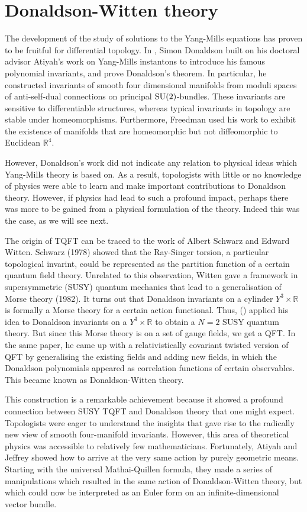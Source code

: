 \section*{Donaldson-Witten theory}
The development of the study of solutions to the Yang-Mills equations 
has proven to be fruitful for differential topology.
In \citeyear{don83}, Simon Donaldson built on his doctoral advisor Atiyah's work on 
Yang-Mills instantons to introduce his famous polynomial invariants, and prove 
Donaldson's theorem.\cite{don83}
In particular, he constructed invariants of
smooth four dimensional manifolds from moduli spaces of anti-self-dual
connections on principal $\operatorname{SU}(2)$-bundles.
These invariants are sensitive to differentiable structures, whereas typical
invariants in topology are stable under homeomorphisms.
Furthermore, Freedman used his work to exhibit the existence of manifolds that
are homeomorphic but not diffeomorphic to Euclidean $\mathbb{R}^{4}$. 

However, Donaldson's work did not
indicate any relation to physical ideas which Yang-Mills theory is based
on. As a result, topologists with little or no knowledge of physics were able to 
learn and make important contributions to Donaldson theory. However, if physics
had lead to such a profound impact, perhaps there was more to be gained from a
physical formulation of the theory. Indeed this was the case, as we will see
next. 

The origin of TQFT can be traced to the work of Albert Schwarz and Edward Witten.
Schwarz (1978) showed that the Ray-Singer torsion, a particular topological invarint,
could be represented as the partition function of a certain quantum field theory. 
Unrelated to this observation, Witten gave a framework in supersymmetric (SUSY)
quantum mechanics that lead to a generalisation of Morse theory (1982).
It turns out that Donaldson invariants on a cylinder $Y^3\times \mathbb{R}$ is
formally a Morse theory for a certain action functional. Thus,
\citet{wittenTQFT} (\citeyear{wittenTQFT}) applied his idea
to Donaldson invariants on a $Y^3\times \mathbb{R}$ to obtain a $N=2$ 
SUSY quantum theory. But since this Morse theory is on a set of 
gauge fields, we get a QFT. In the same paper, he came up with a
relativistically covariant twisted version of QFT by generalising the existing 
fields and adding new fields, in which the Donaldson polynomials appeared as 
correlation functions of certain observables. This became known as Donaldson-Witten theory.

This construction is a remarkable achievement because it showed a profound
connection between SUSY TQFT and Donaldson theory that one might
expect. Topologists were eager to understand the insights that gave rise to the 
radically new view of smooth four-manifold invariants. However, this area of theoretical physics
was accessible to relatively few mathematicians. 
Fortunately, Atiyah and Jeffrey showed how to arrive at the very same action by 
purely geometric means. Starting with the universal Mathai-Quillen formula, they
made a series of manipulations which resulted in the same action of
Donaldson-Witten theory, but which could now be interpreted as an Euler form on
an infinite-dimensional vector bundle.

